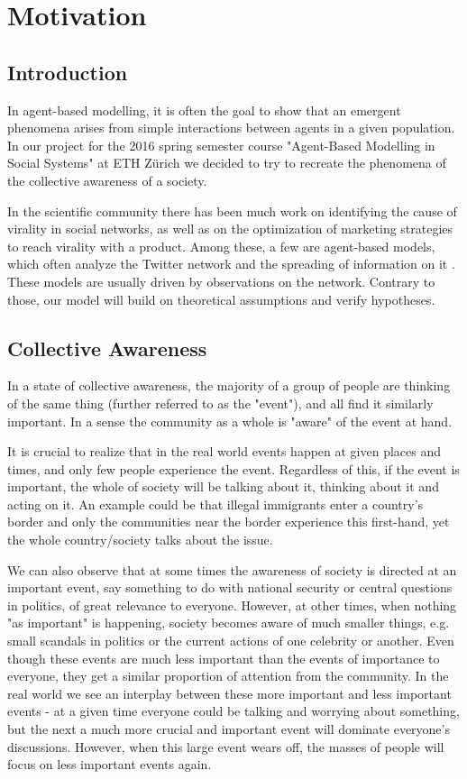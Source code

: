 \documentclass [12pt,a4paper,twoside]{article}
\begin{document}
\section{Motivation}
\subsection{Introduction}
In agent-based modelling, it is often the goal to show that an emergent phenomena arises from simple interactions between agents in a given population. In our project for the 2016 spring semester course "Agent-Based Modelling in Social Systems" at ETH Zürich we decided to try to recreate the phenomena of the collective awareness of a society.

In the scientific community there has been much work on identifying the cause of virality in social networks, as well as on the optimization of marketing strategies to reach virality with a product. Among these, a few are agent-based models, which often analyze the Twitter network and the spreading of information on it \cite{ABM_viral_twitter,ABM_viral_twitter_2,ABM_viral_twitter_3,ABM_viral_twitter_4,ABM_viral_twitter_5,ABM_viral_twitter_6}. These models are usually driven by observations on the network. Contrary to those, our model will build on theoretical assumptions and verify hypotheses.


\subsection{Collective Awareness}

In a state of collective awareness, the majority of a group of people are thinking of the same thing (further referred to as the "event"), and all find it similarly important. In a sense the community as a whole is "aware" of the event at hand.

It is crucial to realize that in the real world events happen at given places and times, and only few people experience the event. Regardless of this, if the event is important, the whole of society will be talking about it, thinking about it and acting on it. An example could be that illegal immigrants enter a country's border and only the communities near the border experience this first-hand, yet the whole country/society talks about the issue.

We can also observe that at some times the awareness of society is directed at an important event, say something to do with national security or central questions in politics, of great relevance to everyone. However, at other times, when nothing "as important" is happening, society becomes aware of much smaller things, e.g. small scandals in politics or the current actions of one celebrity or another. Even though these events are much less important than the events of importance to everyone, they get a similar proportion of attention from the community. In the real world we see an interplay between these more important and less important events - at a given time everyone could be talking and worrying about something, but the next a much more crucial and important event will dominate everyone's discussions. However, when this large event wears off, the masses of people will focus on less important events again.
\end{document}
